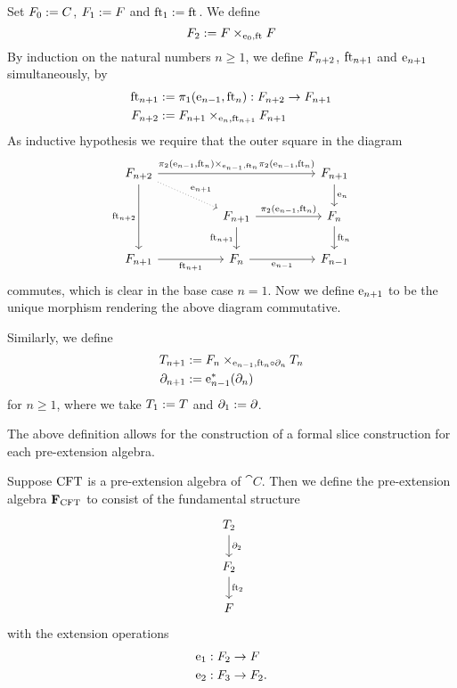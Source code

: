 \begin{defn}
Set $\stesysf_0:=\stesysc$, $\stesysf_1:=\stesysf$ and $\eft[1]:=\eft$. We define
\begin{equation*}
\stesysf_{2} 
  := \pullback{\stesysf}{\stesysf}{\ectxext}{\eft}
\end{equation*}
By induction on the natural numbers $n\geq 1$, we define $\stesysf_{n+2}$, $\eft[n+1]$ and
$\eext{n+1}$ simultaneously, by
\begin{align*}
\eft[n+1] 
  & := \pullbackpr{1}{\eext{n-1}}{\eft[n]} : \stesysf_{n+2}\to\stesysf_{n+1}
  \\
\stesysf_{n+2} 
  & := \pullback{\stesysf_{n+1}}{\stesysf_{n+1}}{\eext{n}}{\eft[n+1]}
\end{align*}
As inductive hypothesis we require that the outer square in the diagram
\begin{equation*}
\begin{tikzcd}[column sep=huge]
\stesysf_{n+2}
  \ar[dotted]{dr}{\eext{n+1}}
  \ar{rr}{\pullback{\pullbackpr{2}{\eext{n-1}}{\eft[n]}}{\pullbackpr{2}{\eext{n-1}}{\eft[n]}}{\eext{n-1}}{\eft[n]}}
  \ar{dd}[swap]{\eft[n+2]}
  & 
  &
\stesysf_{n+1}
  \ar{d}{\eext{n}}
  \\
  &
\stesysf_{n+1}
  \ar{d}[swap]{\eft[n+1]}
  \ar{r}{\pullbackpr{2}{\eext{n-1}}{\eft[n]}}
  &
\stesysf_{n}
  \ar{d}{\eft[n]}
  \\
\stesysf_{n+1}
  \ar{r}[swap]{\eft[n+1]}
  &
\stesysf_{n}
  \ar{r}[swap]{\eext{n-1}}
  &
\stesysf_{n-1}
\end{tikzcd}
\end{equation*}
commutes, which is clear in the base case $n=1$. Now we define $\eext{n+1}$ to be the
unique morphism rendering the above diagram commutative.

Similarly, we define
\begin{align*}
\stesyst_{n+1} 
  & := \pullback{\stesysf_n}{\stesyst_n}{\eext{n-1}}{\eft[n]\circ\ebd[n]}
  \\
\ebd[n+1]
  & := \eext{n-1}^\ast(\ebd[n])
\end{align*}
for $n\geq 1$, where we take $\stesyst_1:=\stesyst$ and $\ebd[1]:=\ebd$.
\end{defn}

The above definition allows for the construction of a formal slice construction
for each pre-extension algebra.

\begin{defn}
Suppose $\stesys$ is a pre-extension algebra of $\cat{C}$. Then we define the 
pre-extension algebra $\famesys{\stesys}$ to consist of the fundamental 
structure
\begin{equation*}
\begin{tikzcd}
\stesyst_2
  \ar{d}{\ebd[2]}
  \\
\stesysf_2
  \ar{d}{\eft[2]}
  \\
\stesysf
\end{tikzcd}
\end{equation*}
with the extension operations
\begin{align*}
\efamext 
  & 
  : \stesysf_2\to\stesysf\\
\eext{2} & : \stesysf_3\to\stesysf_2.
\end{align*}
\end{defn}

